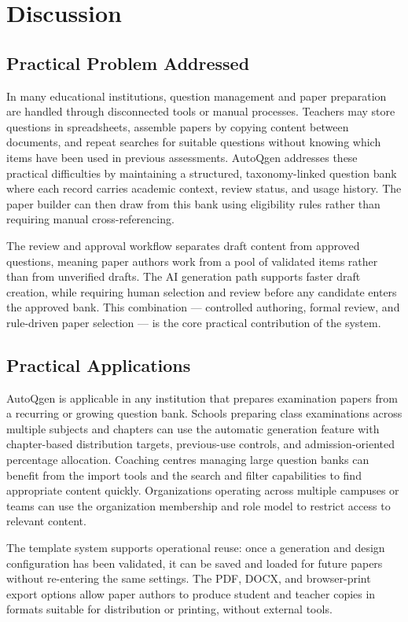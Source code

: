 \section{Discussion}

\subsection{Practical Problem Addressed}

In many educational institutions, question management and paper preparation are handled through disconnected tools or manual processes. Teachers may store questions in spreadsheets, assemble papers by copying content between documents, and repeat searches for suitable questions without knowing which items have been used in previous assessments. AutoQgen addresses these practical difficulties by maintaining a structured, taxonomy-linked question bank where each record carries academic context, review status, and usage history. The paper builder can then draw from this bank using eligibility rules rather than requiring manual cross-referencing.

The review and approval workflow separates draft content from approved questions, meaning paper authors work from a pool of validated items rather than from unverified drafts. The AI generation path supports faster draft creation, while requiring human selection and review before any candidate enters the approved bank. This combination — controlled authoring, formal review, and rule-driven paper selection — is the core practical contribution of the system.

\subsection{Practical Applications}

AutoQgen is applicable in any institution that prepares examination papers from a recurring or growing question bank. Schools preparing class examinations across multiple subjects and chapters can use the automatic generation feature with chapter-based distribution targets, previous-use controls, and admission-oriented percentage allocation. Coaching centres managing large question banks can benefit from the import tools and the search and filter capabilities to find appropriate content quickly. Organizations operating across multiple campuses or teams can use the organization membership and role model to restrict access to relevant content.

The template system supports operational reuse: once a generation and design configuration has been validated, it can be saved and loaded for future papers without re-entering the same settings. The PDF, DOCX, and browser-print export options allow paper authors to produce student and teacher copies in formats suitable for distribution or printing, without external tools.

